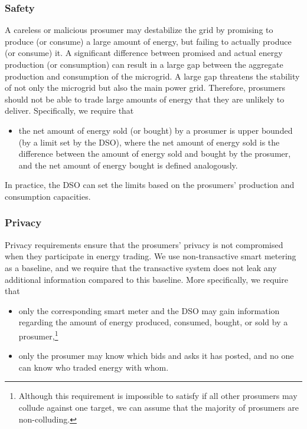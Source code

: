 \subsubsection{Safety}
A careless or malicious prosumer may destabilize the grid by promising
to produce (or consume) a large amount of energy, but failing to actually
produce (or consume) it.  A significant difference between promised and
actual energy production (or consumption) can result in a large gap
between the aggregate production and consumption of the microgrid.
A large gap threatens the stability of not only the microgrid but also the main
power grid.  Therefore, prosumers should not be able to trade large
amounts of energy that they are unlikely to deliver.
Specifically, we require that 
\begin{itemize}[noitemsep,topsep=-\parskip]
\item the net amount of energy sold (or bought) by a prosumer is upper
  bounded (by a limit set by the DSO), where the net amount of
  energy sold is the difference between the amount of energy sold and
  bought by the prosumer, and the net amount of energy bought is
  defined analogously. %
\end{itemize}
In practice, the DSO can set the limits based on the prosumers' production and consumption capacities.

\subsubsection{Privacy} 
Privacy requirements ensure that the prosumers' privacy is not
compromised when they participate in energy trading.  We use
non-transactive smart metering as a baseline, and we require that
the transactive system does not leak any additional information
compared to this baseline.  More specifically, we require that
\begin{itemize}[noitemsep,topsep=-\parskip]
\item only the corresponding smart meter and the DSO may gain
  information regarding the amount of energy produced, consumed,
  bought, or sold by a prosumer,\footnote{Although this requirement is
    impossible to satisfy if all other prosumers may collude against
    one target, we can assume that the majority of prosumers are
    non-colluding.}
\item only the prosumer may know which bids and asks it has posted,
  and no one can know who traded energy with whom.
\end{itemize}


